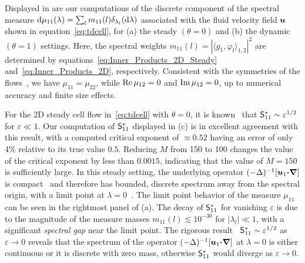 \documentclass[amsa]{ipart}
\begin{document}
Displayed in  are our
computations of the discrete component of the spectral measure
$\mathrm{d}\mu_{11}(\lambda)=\sum_lm_{11}(l)\delta_{\lambda_l}(\mathrm{d}\lambda)$ associated with the fluid
velocity field $\boldsymbol{u}$ shown in equation~\eqref{eq:tdcell}, for (a)
the steady $(\theta=0)$ and (b) the dynamic $(\theta=1)$ settings. Here, the
spectral weights $m_{11}(l)=|\langle g_1,\varphi_l\rangle_{1,2}|^2$ are determined by
equations~\eqref{eq:Inner_Products_2D_Steady}
and~\eqref{eq:Inner_Products_2D}, respectively.  Consistent with the
symmetries of the flows~\cite{Biferale:PF:2725}, we have
$\mu_{11}=\mu_{22}$, while $\mbox{Re}\,\mu_{12}=0$ and $\mbox{Im}\,\mu_{12}=0$, up to
numerical accuracy and finite size effects.




For the 2D steady cell
flow in~\eqref{eq:tdcell} with $\theta=0$, it is
known~\cite{Fannjiang:1994:SIAM_JAM:333,Novikov:2005:CPAM:867} that
$\mathsf{S}^*_{11}\sim\varepsilon^{1/2}$ for $\varepsilon\ll1$. Our computation of $\mathsf{S}^*_{11}$
displayed in (c) is in
excellent agreement with this result, with a computed critical
exponent of $\approx0.52$ having an error of only $4\%$ relative to its true
value $0.5$. Reducing $M$ from 150 to 100 changes the value of the
critical exponent by less than $0.0015$, indicating that the value of
$M=150$ is sufficiently large. In this steady setting, the underlying
operator $(-\Delta)^{-1}[\boldsymbol{u}_1\mbox{\boldmath${\cdot}$}\mbox{\boldmath${\nabla}$}]$ is
compact~\cite{Bhattacharya:AAP:1999:951} and therefore has 
bounded, discrete spectrum away from the spectral origin, with a limit
point at $\lambda=0$~\cite{Stakgold:BVP:2000}. The limit point behavior of  
the measure $\mu_{11}$ can be seen in the rightmost panel of
(a). The decay of $\mathsf{S}^*_{11}$
for vanishing $\varepsilon$ is due to the magnitude of the measure masses
$m_{11}(l)\lesssim10^{-30}$ for $|\lambda_l|\ll1$, with a significant \emph{spectral
  gap} near the limit point. The rigorous
result~\cite{Fannjiang:1994:SIAM_JAM:333,Novikov:2005:CPAM:867} $\mathsf{S}^*_{11}\sim\varepsilon^{1/2}$ as
$\varepsilon\to0$ reveals that the spectrum of the operator
$(-\Delta)^{-1}[\boldsymbol{u}_1\mbox{\boldmath${\cdot}$}\mbox{\boldmath${\nabla}$}]$ at $\lambda=0$ is either
continuous or it is discrete with zero mass,
otherwise $\mathsf{S}^*_{11}$ would diverge as $\varepsilon\to0$.  
\end{document}
